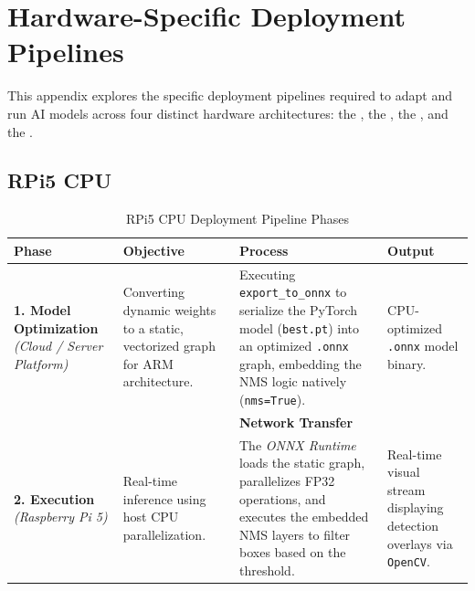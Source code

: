 \chapter{Hardware-Specific Deployment Pipelines}\label{ap:boards_pipelines}

This appendix explores the specific deployment pipelines required to adapt and run \gls{AI} models across four distinct hardware architectures: the , the , the , and the .


\section{\texorpdfstring{\acrshort{RPi}}{RPi}5 \texorpdfstring{\acrshort{CPU}}{CPU}}\label{ap:pipelines:rpi5}

\begin{table}[H]
    \centering
    \caption{\acrshort{RPi}5 \acrshort{CPU} Deployment Pipeline Phases}
    \label{tab:rpi5_cpu_pipeline}
    \begin{tabular}{p{}
                    p{}
                    p{}
                    p{}}
        \toprule
        \textbf{Phase} & \textbf{Objective} & \textbf{Process} & \textbf{Output} \\ 
        \toprule
        
        \textbf{1. Model Optimization} \newline \textit{(Cloud / Server Platform)} & 
        Converting dynamic weights to a static, vectorized graph for \gls{ARM} architecture. & 
        Executing \texttt{export\_to\_onnx} to serialize the PyTorch model (\texttt{best.pt}) into an optimized \texttt{.onnx} graph, embedding the \gls{NMS} logic natively (\texttt{nms=True}). & 
        \gls{CPU}-optimized \texttt{.onnx} model binary. \\ 
        \midrule
        
        & 
        & 
        \textbf{Network Transfer} & 
         \\ 
        \midrule

        \textbf{2. Execution} \newline \textit{(Raspberry Pi 5)} & 
        Real-time inference using host \gls{CPU} parallelization. & 
        The \textit{ONNX Runtime} loads the static graph, parallelizes FP32 operations, and executes the embedded \gls{NMS} layers to filter boxes based on the threshold. & 
        Real-time visual stream displaying detection overlays via \texttt{OpenCV}. \\ 
        \bottomrule
    \end{tabular}
\end{table}

